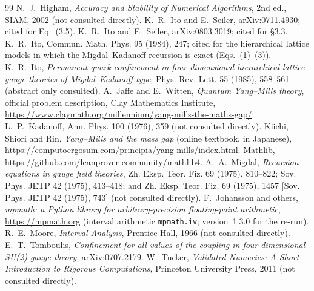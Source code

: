 \documentclass[11pt,a4paper]{article}
\theoremstyle{definition}
\theoremstyle{remark}
\newcommand{\code}[1]{\texttt{#1}}
\begin{document}
\begin{thebibliography}{99}
 N.~J.~Higham, \emph{Accuracy and Stability of Numerical Algorithms}, 2nd ed., SIAM, 2002 (not consulted directly).
 K.~R.~Ito and E.~Seiler, arXiv:0711.4930; cited for Eq.~(3.5).
 K.~R.~Ito and E.~Seiler, arXiv:0803.3019; cited for \S3.3.
 K.~R.~Ito, Commun. Math. Phys. 95 (1984), 247; cited for the hierarchical lattice models in which the Migdal--Kadanoff recursion is exact (Eqs.~(1)--(3)).
 K.~R.~Ito, \emph{Permanent quark confinement in four-dimensional hierarchical lattice gauge theories of Migdal--Kadanoff type}, Phys. Rev. Lett. 55 (1985), 558--561 (abstract only consulted).
 A.~Jaffe and E.~Witten, \emph{Quantum Yang--Mills theory}, official problem description, Clay Mathematics Institute, \url{https://www.claymath.org/millennium/yang-mills-the-maths-gap/}.
 L.~P.~Kadanoff, Ann. Phys. 100 (1976), 359 (not consulted directly).
 Kiichi, Shiori and Rin, \emph{Yang--Mills and the mass gap} (online textbook, in Japanese), \url{https://computoergosum.com/principia/yang-mills/index.html}.
 Mathlib, \url{https://github.com/leanprover-community/mathlib4}.
 A.~A.~Migdal, \emph{Recursion equations in gauge field theories}, Zh. Eksp. Teor. Fiz. 69 (1975), 810--822; Sov. Phys. JETP 42 (1975), 413--418; and Zh. Eksp. Teor. Fiz. 69 (1975), 1457 [Sov. Phys. JETP 42 (1975), 743] (not consulted directly).
 F.~Johansson and others, \emph{mpmath: a Python library for arbitrary-precision floating-point arithmetic}, \url{https://mpmath.org} (interval arithmetic \code{mpmath.iv}; version~1.3.0 for the re-run).
 R.~E.~Moore, \emph{Interval Analysis}, Prentice-Hall, 1966 (not consulted directly).
 E.~T.~Tomboulis, \emph{Confinement for all values of the coupling in four-dimensional SU(2) gauge theory}, arXiv:0707.2179.
 W.~Tucker, \emph{Validated Numerics: A Short Introduction to Rigorous Computations}, Princeton University Press, 2011 (not consulted directly).
\end{thebibliography}
\end{document}
